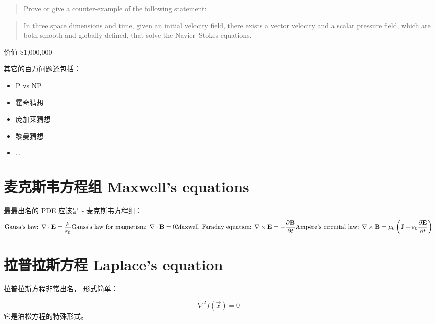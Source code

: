 \documentclass[
]{book}
\providecommand{\tightlist}{%
  \setlength{\itemsep}{0pt}\setlength{\parskip}{0pt}}
\begin{document}
\begin{quote}
Prove or give a counter-example of the following statement:
\end{quote}

\begin{quote}
In three space dimensions and time, given an initial velocity field, there exists a vector velocity and a scalar pressure field, which are both smooth and globally defined, that solve the Navier--Stokes equations.
\end{quote}

价值 \$1,000,000

其它的百万问题还包括：

\begin{itemize}
\tightlist
\item
  P vs NP
\item
  霍奇猜想
\item
  庞加莱猜想
\item
  黎曼猜想
\item
  \ldots{}
\end{itemize}

\hypertarget{ux9ea6ux514bux65afux97e6ux65b9ux7a0bux7ec4-maxwells-equations}{%
\section{麦克斯韦方程组 Maxwell's equations}\label{ux9ea6ux514bux65afux97e6ux65b9ux7a0bux7ec4-maxwells-equations}}

最最出名的 PDE 应该是 - 麦克斯韦方程组：
\[
\text{Gauss's law: } \nabla \cdot \mathbf {E} ={\frac {\rho }{\varepsilon _{0}}}\\
\text{Gauss's law for magnetism: }\nabla \cdot \mathbf {B} =0\\
\text{Maxwell–Faraday equation: }\nabla \times \mathbf {E} =-{\frac {\partial \mathbf {B} }{\partial t}}\\
\text{Ampère's circuital law: }\nabla \times \mathbf {B} =\mu _{0}\left(\mathbf {J} +\varepsilon _{0}{\frac {\partial \mathbf {E} }{\partial t}}\right)
\]

\hypertarget{ux62c9ux666eux62c9ux65afux65b9ux7a0b-laplaces-equation}{%
\section{拉普拉斯方程 Laplace's equation}\label{ux62c9ux666eux62c9ux65afux65b9ux7a0b-laplaces-equation}}

拉普拉斯方程非常出名， 形式简单：

\[
\nabla^2 f(\vec{x}) = 0
\]
它是泊松方程的特殊形式。
\end{document}
